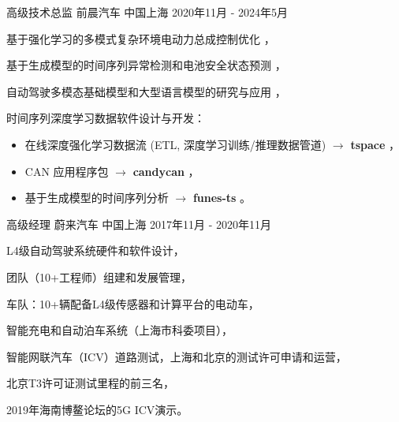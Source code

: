 \documentclass[../resume_xin.tex]{subfiles}
\begin{document}


\begin{cventries}

  \cventry
    {高级技术总监} %
    {前晨汽车} %
    {中国上海} %
    {2020年11月 - 2024年5月} %
    {
      \begin{cvitems} %
          \item 基于强化学习的多模式复杂环境电动力总成控制优化
          \supercite{Xin_VEOS_22}，
          \item 基于生成模型的时间序列异常检测和电池安全状态预测 \supercite{Xin_GenAI_23}，
          \item 自动驾驶多模态基础模型和大型语言模型的研究与应用 \supercite{Xin_VLM_24} \supercite{Xin_Latent_Diffusion_23}，
          \item 时间序列深度学习数据软件设计与开发：
            \begin{itemize}
                    \item 在线深度强化学习数据流 (ETL, 深度学习训练/推理数据管道) $\rightarrow$ \textbf{tspace} \href{https://binjian.github.io/tspace/}{}，
                    \item CAN 应用程序包 $\rightarrow$ \textbf{candycan} \href{https://binjian.github.io/candycan/}{}，
                    \item 基于生成模型的时间序列分析 $\rightarrow$ \textbf{funes-ts} \href{https://github.io/binjian/funes-ts/}{}。
            \end{itemize}
      \end{cvitems}
    }

  \cventry
    {高级经理} %
    {蔚来汽车} %
    {中国上海} %
    {2017年11月 - 2020年11月} %
    {
      \begin{cvitems}
        \item L4级自动驾驶系统硬件和软件设计，
        \item 团队（10+工程师）组建和发展管理，
        \item 车队：10+辆配备L4级传感器和计算平台的电动车，
        \item 智能充电和自动泊车系统（上海市科委项目），
        \item 智能网联汽车（ICV）道路测试，上海和北京的测试许可申请和运营，
        \item 北京T3许可证测试里程的前三名，
        \item 2019年海南博鳌论坛的5G ICV演示。
      \end{cvitems}
    }


\end{cventries}
\end{document}
